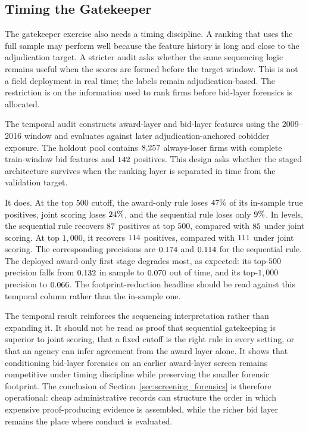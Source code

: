 \subsection{Timing the Gatekeeper}
\label{sec:temporal_gatekeeper}

The gatekeeper exercise also needs a timing discipline. A
ranking that uses the full sample may perform well because the
feature history is long and close to the adjudication target. A
stricter audit asks whether the same sequencing logic remains
useful when the scores are formed before the target window. This
is not a field deployment in real time; the labels remain
adjudication-based. The restriction is on the information used to
rank firms before bid-layer forensics is allocated.

The temporal audit constructs award-layer and bid-layer features
using the 2009--2016 window and evaluates against later
adjudication-anchored cobidder exposure. The holdout pool
contains $8{,}257$ always-loser firms with complete
train-window bid features and $142$ positives. This
design asks whether the staged architecture survives when the
ranking layer is separated in time from the validation target.

It does. At the top $500$ cutoff, the award-only rule loses
$47\%$ of its in-sample true positives, joint
scoring loses $24\%$, and the sequential rule
loses only $9\%$. In levels, the sequential rule
recovers $87$ positives at top $500$,
compared with $85$ under joint scoring.
At top $1{,}000$, it recovers $114$ positives,
compared with $111$ under joint scoring. The
corresponding precisions are $0.174$ and
$0.114$ for the sequential rule.
The deployed award-only first stage degrades most, as expected:
its top-$500$ precision falls from $0.132$ in
sample to $0.070$ out of time, and its
top-$1{,}000$ precision to $0.066$. The
footprint-reduction headline should be read against this temporal
column rather than the in-sample one.

The temporal result reinforces the sequencing interpretation
rather than expanding it. It should not be read as proof that
sequential gatekeeping is superior to joint scoring, that a fixed
cutoff is the right rule in every setting, or that an agency can
infer agreement from the award layer alone. It shows that
conditioning bid-layer forensics on an earlier award-layer screen
remains competitive under timing discipline while preserving the
smaller forensic footprint. The conclusion of
Section~\ref{sec:screening_forensics} is therefore operational:
cheap administrative records can structure the order in which
expensive proof-producing evidence is assembled, while the richer
bid layer remains the place where conduct is evaluated.

